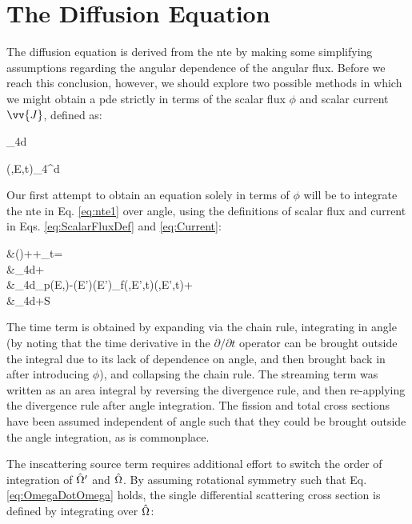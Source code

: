\section{The Diffusion Equation}
\label{sec:Diffusion}

The diffusion equation is derived from the \gls{nte} by making some simplifying assumptions regarding the angular dependence of the angular flux. Before we reach this conclusion, however, we should explore two possible methods in which we might obtain a \gls{pde} strictly in terms of the scalar flux \(\phi\) and scalar current \(\vv{J}\), defined as:

\beq
\label{eq:ScalarFluxDef}
\phi\sset\equiv\int_{4\pi}d\hO\psi\seat
\eeq

\beq
\label{eq:Current}
(,E,t)\equiv\int_{4\pi}^{}d\hO  {}\seat
\eeq

Our first attempt to obtain an equation solely in terms of \(\phi\) will be to integrate the \gls{nte} in Eq. \eqref{eq:nte1} over angle, using the definitions of scalar flux and current in Eqs. \eqref{eq:ScalarFluxDef} and \eqref{eq:Current}:

\beqa
\label{eq:NeutronContinuityEquation}
&\left(\right)+\nabla\cdot{}\sset+\Sigma_t\sset\phi\sset=\\
&\hspace{1cm}\int_{4\pi}d\hO\inscatteringsource\psi\seatelse+\\
&\hspace{2cm}\int_{4\pi}d\hO\chi_p(E,\hO)\dEprime\left{}-\beta(E')\right\rbrack\nu(E')\Sigma_f(,E',t)\phi(,E',t)+\\
&\hspace{3cm}\int_{4\pi}d\hO\delayedfissionsource+S\sset
\eeqa

The time term is obtained by expanding via the chain rule, integrating in angle (by noting that the time derivative in the \(\partial/\partial t\) operator can be brought outside the integral due to its lack of dependence on angle, and then brought back in after introducing \(\phi\)), and collapsing the chain rule. The streaming term was written as an area integral by reversing the divergence rule, and then re-applying the divergence rule after angle integration. The fission and total cross sections have been assumed independent of angle such that they could be brought outside the angle integration, as is commonplace. 

The inscattering source term requires additional effort to switch the order of integration of \(\hat{\Omega}'\) and \(\hat{\Omega}\). By assuming rotational symmetry such that Eq. \eqref{eq:OmegaDotOmega} holds, the single differential scattering cross section is defined by integrating over \(\hat{\Omega}\):

